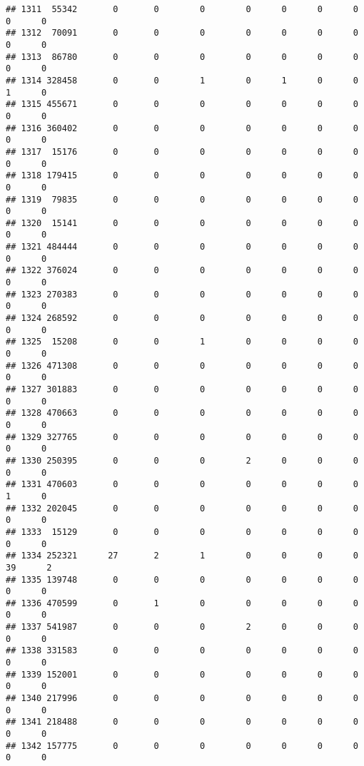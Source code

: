 \documentclass[
]{article}
\begin{document}
\begin{verbatim}
## 1311  55342       0       0        0        0      0      0      0     0      0
## 1312  70091       0       0        0        0      0      0      0     0      0
## 1313  86780       0       0        0        0      0      0      0     0      0
## 1314 328458       0       0        1        0      1      0      0     1      0
## 1315 455671       0       0        0        0      0      0      0     0      0
## 1316 360402       0       0        0        0      0      0      0     0      0
## 1317  15176       0       0        0        0      0      0      0     0      0
## 1318 179415       0       0        0        0      0      0      0     0      0
## 1319  79835       0       0        0        0      0      0      0     0      0
## 1320  15141       0       0        0        0      0      0      0     0      0
## 1321 484444       0       0        0        0      0      0      0     0      0
## 1322 376024       0       0        0        0      0      0      0     0      0
## 1323 270383       0       0        0        0      0      0      0     0      0
## 1324 268592       0       0        0        0      0      0      0     0      0
## 1325  15208       0       0        1        0      0      0      0     0      0
## 1326 471308       0       0        0        0      0      0      0     0      0
## 1327 301883       0       0        0        0      0      0      0     0      0
## 1328 470663       0       0        0        0      0      0      0     0      0
## 1329 327765       0       0        0        0      0      0      0     0      0
## 1330 250395       0       0        0        2      0      0      0     0      0
## 1331 470603       0       0        0        0      0      0      0     1      0
## 1332 202045       0       0        0        0      0      0      0     0      0
## 1333  15129       0       0        0        0      0      0      0     0      0
## 1334 252321      27       2        1        0      0      0      0    39      2
## 1335 139748       0       0        0        0      0      0      0     0      0
## 1336 470599       0       1        0        0      0      0      0     0      0
## 1337 541987       0       0        0        2      0      0      0     0      0
## 1338 331583       0       0        0        0      0      0      0     0      0
## 1339 152001       0       0        0        0      0      0      0     0      0
## 1340 217996       0       0        0        0      0      0      0     0      0
## 1341 218488       0       0        0        0      0      0      0     0      0
## 1342 157775       0       0        0        0      0      0      0     0      0

\end{verbatim}
\end{document}
